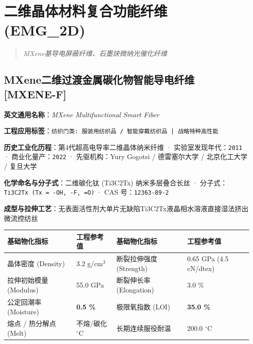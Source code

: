 \documentclass[11pt,openright,twoside,UTF8]{ctexbook}
\begin{document}
\chapter{二维晶体材料复合功能纤维 (EMG\_2D)}
\begin{quote}
\small\itshape
MXene基导电屏蔽纤维、石墨炔微纳光催化纤维
\end{quote}

\section{MXene二维过渡金属碳化物智能导电纤维 [MXENE-F]}
\label{sec:mxene-f}

\noindent\textbf{英文通用名称}：\textit{MXene Multifunctional Smart Fiber}\par
\noindent\textbf{工程应用标签}：\texttt{纺织门类: 服装用纺织品 / 智能穿戴纺织品 | 战略特种高性能}\par
\noindent\textbf{历史工业化历程}：第4代超高电导率二维晶体纳米纤维 · 实验室发现年代：\texttt{2011} · 商业化量产：\texttt{2022} · 先驱机构：Yury Gogotsi / 德雷塞尔大学 / 北京化工大学 / 复旦大学\par
\noindent\textbf{化学命名与分子式}：二维碳化钛 (Ti3C2Tx) 纳米多层叠合长丝 · 分子式：\texttt{Ti3C2Tx (Tx = -OH, -F, =O)} · CAS 号：\texttt{12363-89-2}\par
\noindent\textbf{成型与拉伸工艺}：无表面活性剂大单片无缺陷Ti3C2Tx液晶相水溶液直接湿法挤出微流控纺丝\par

\vspace{0.15cm}
\begin{center}
\small
\begin{tabularx}{\textwidth}{p{3.8cm}Xp{3.8cm}X}
\toprule
\textbf{基础物化指标} & \textbf{工程参考值} & \textbf{基础物化指标} & \textbf{工程参考值} \\
\midrule
晶体密度 (Density) & 3.2 g/cm$^3$ & 断裂拉伸强度 (Strength) & 0.65 GPa (4.5 cN/dtex) \\
拉伸初始模量 (Modulus) & 55.0 GPa & 断裂伸长率 (Elongation) & 3.0 \% \\
公定回潮率 (Moisture) & \textbf{0.5 \%} & 极限氧指数 (LOI) & \textbf{35.0 \%} \\
熔点 / 热分解点 (Melt) & 不熔/碳化 $^\circ\mathrm{C}$ & 长期连续服役耐温 & 200.0 $^\circ\mathrm{C}$ \\
\bottomrule
\end{tabularx}
\end{center}
\vspace{0.15cm}
\end{document}
